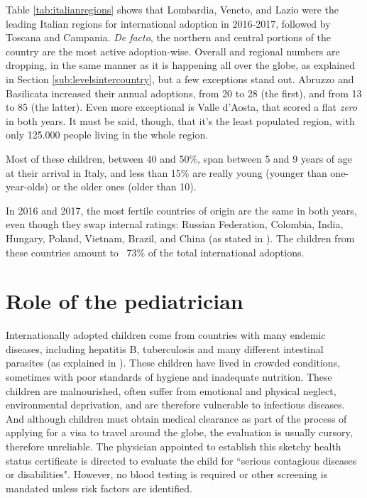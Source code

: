 Table \ref{tab:italianregions} shows that Lombardia, Veneto, and Lazio were the leading Italian regions for international adoption in 2016-2017, followed by Toscana and Campania. \textit{De facto}, the northern and central portions of the country are the most active adoption-wise.  Overall and regional numbers are dropping, in the same manner as it is happening all over the globe, as explained in Section \ref{sub:levelsintercountry}, but a few exceptions stand out. Abruzzo and Basilicata increased their annual adoptions, from 20 to 28 (the first), and from 13 to 85 (the latter). Even more exceptional is Valle d'Aosta, that scored a flat \textit{zero} in both years. It must be said, though, that it's the least populated region, with only 125.000 people living in the whole region.

Most of these children, between 40 and 50\%, span between 5 and 9 years of age at their arrival in Italy, and less than 15\% are really young (younger than one-year-olds) or the older ones (older than 10). 

In 2016 and 2017, the most fertile countries of origin are the same in both years, even though they swap internal ratings: Russian Federation, Colombia, India, Hungary, Poland, Vietnam, Brazil, and China (as stated in \cite{cai2016}). The children from these countries amount to ~73\% of the total international adoptions.

\section{Role of the pediatrician}\label{sec:roleofpediatrician}
Internationally adopted children come from countries with many endemic diseases, including hepatitis B, tuberculosis and many different intestinal parasites (as explained in \cite{caringfor}). These children have lived in crowded conditions, sometimes with poor standards of hygiene and inadequate nutrition. These children are malnourished, often suffer from emotional and physical neglect, environmental deprivation, and are therefore vulnerable to infectious diseases. And although children must obtain medical clearance as part of the process of applying for a visa to travel around the globe, the evaluation is usually cursory, therefore unreliable. The physician appointed to establish this sketchy health status certificate is directed to evaluate the child for ``serious contagious diseases or disabilities". However, no blood testing is required or other screening is mandated unless risk factors are identified.

